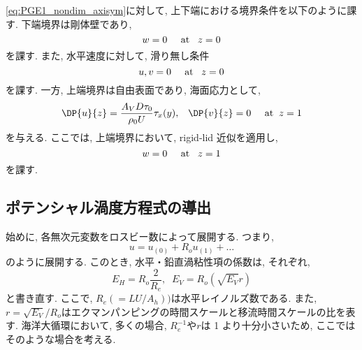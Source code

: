 \eqref{eq:PGE1_nondim_axisym}に対して, 上下端における境界条件を以下のように課す. 
下端境界は剛体壁であり, 
\begin{equation}
  w = 0 \;\;\;\;\; {\rm at} \;\;\; z=0
\end{equation}
を課す. 
また, 水平速度に対して, 滑り無し条件
\begin{equation}
  u, v = 0 \;\;\;\;\; {\rm at} \;\;\; z=0
\end{equation}
を課す. 
一方, 上端境界は自由表面であり, 海面応力として, 
\begin{equation}
  \DP{u}{z} = \dfrac{A_V D \tau_0}{\rho_0 U} \tau_x(y), \;\;\; \DP{v}{z} = 0  \;\;\;\;\; {\rm at} \;\; z=1
\end{equation}
を与える. 
ここでは, 上端境界において, rigid-lid 近似を適用し, 
\begin{equation}
  w = 0 \;\;\;\;\; {\rm at} \;\;\; z=1
\end{equation}
を課す. 

\subsection{ポテンシャル渦度方程式の導出}
始めに, 各無次元変数をロスビー数によって展開する.  
つまり, 
\begin{equation}
  u = u_{(0)} + R_o u_{(1)} + \dots
\end{equation}
のように展開する. 
このとき, 水平・鉛直渦粘性項の係数は, それぞれ, 
\begin{equation}
  E_H = R_o \dfrac{2}{R_e}, \;\; E_V = R_o (\sqrt{E_V} r)
\end{equation}
と書き直す. 
ここで, $R_e(=LU/A_h))$は水平レイノルズ数である. 
また, $r=\sqrt{E_V}/{R_o}$はエクマンパンピングの時間スケールと移流時間スケールの比を表す. 
海洋大循環において, 多くの場合, $R_e^{-1}$や$r$は 1 より十分小さいため, 
ここではそのような場合を考える. 

